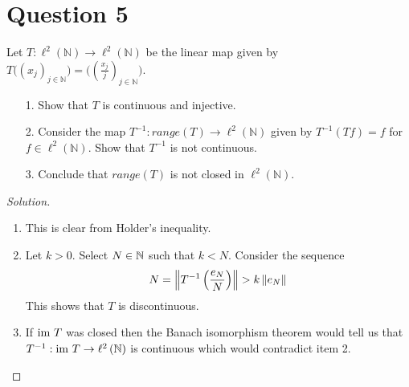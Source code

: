 \section{Question 5}
\horz
Let $T : \ell^2(\mathbb N) \to \ell^2(\mathbb N)$ be the linear map given by $T \Big((x_j)_{j\in\mathbb N}\Big) = \Big ( (\frac{x_j}{j})_{j\in \mathbb N}\Big).$ 

\begin{itemize}
\item[1.] Show that $T$ is continuous and injective.
\item[2.] Consider the map $T^{-1} : range (T) \to \ell^2(\mathbb N)$ given by $T^{-1}(Tf) =f$ for $f\in \ell^2(\mathbb N).$ Show that $T^{-1}$ is not continuous.
\item[3.] Conclude that $range (T)$ is not closed in $\ell^2(\mathbb N).$  
\end{itemize}
\horz

\begin{proof}[Solution]
    \begin{enumerate}
	\item This is clear from Holder's inequality.
	\item Let $k > 0$. Select $N \in \mathbb N$ such that $k < N$. Consider the sequence
	    \begin{align*}
		N=\left\lVert T^{-1}\left( \frac{e_{N}}{N} \right) \right\rVert > k \left\lVert e_{N} \right\rVert
	    \end{align*}
    This shows that $T$ is discontinuous.
\item If ${\text{im }} T$ was closed then the Banach isomorphism theorem would tell us that $T^{-1} : {\text{im }} T \to \ell ^{2} \left( \mathbb N \right)$ is continuous which would contradict item 2.
    
    \end{enumerate}
\end{proof}
